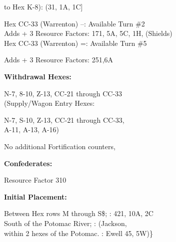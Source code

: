 to Hex K-8): (31, 1A, 1C]

\begin{scenariodata}
Hex CC-33 (Warrenton) --: Available Turn \#2\\
Adds + 3 Resource Factors: 171, 5A, 5C, 1H, (Shields)\\
Hex CC-33 (Warrenton) =: Available Turn \#5\\
\end{scenariodata}

\begin{scenariodata}
Adds + 3 Resource Factors: 251,6A\\
\end{scenariodata}

\begin{scenariodata}
\textbf{Withdrawal Hexes:}\\
\end{scenariodata}

\begin{scenariodata}
N-7, 8-10, Z-13, CC-21 through CC-33\\
(Supply/Wagon Entry Hexes:\\
\end{scenariodata}

\begin{scenariodata}
N-7, S-10, Z-13, CC-21 through CC-33,\\
A-11, A-13, A-16)\\
\end{scenariodata}

\begin{scenariodata}
No additional Fortification counters,\\
\end{scenariodata}

\begin{scenariodata}
\textbf{Confederates:}\\
\end{scenariodata}

\begin{scenariodata}
Resource Factor 310\\
\end{scenariodata}

\begin{scenariodata}
\textbf{Initial Placement:}\\
\end{scenariodata}

\begin{scenariodata}
Between Hex rows M through S\$; : 421, 10A, 2C\\
South of the Potomac River; : (Jackson,\\
within 2 hexes of the Potomac. : Ewell 45, 5W)\}\\
\end{scenariodata}


